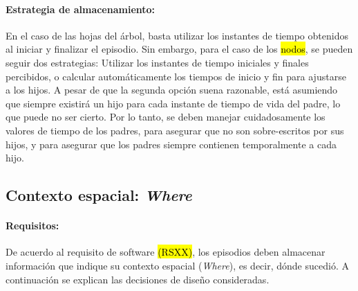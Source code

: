 \paragraph{Estrategia de almacenamiento:}
En el caso de las hojas del árbol, basta utilizar los instantes de tiempo obtenidos al iniciar y finalizar el episodio. Sin embargo, para el caso de los \hl{nodos}, se pueden seguir dos estrategias: Utilizar los instantes de tiempo iniciales y finales percibidos, o calcular automáticamente los tiempos de inicio y fin para ajustarse a los hijos. A pesar de que la segunda opción suena razonable, está asumiendo que siempre existirá un hijo para cada instante de tiempo de vida del padre, lo que puede no ser cierto. Por lo tanto, se deben manejar cuidadosamente los valores de tiempo de los padres, para asegurar que no son sobre-escritos por sus hijos, y para asegurar que los padres siempre contienen temporalmente a cada hijo.


\subsection{Contexto espacial: \textit{Where}}

\paragraph{Requisitos:}
De acuerdo al requisito de software \hl{(RSXX)}, los episodios deben almacenar información que indique su contexto espacial (\textit{Where}), es decir, dónde sucedió. A continuación se explican las decisiones de diseño consideradas.

